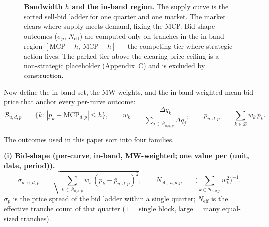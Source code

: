 \documentclass[11pt]{article}
\begin{document}
\begin{figure}[htbp]
\caption{\textbf{Bandwidth $h$ and the in-band region.} The supply curve
is the sorted sell-bid ladder for one quarter and one market. The market
clears where supply meets demand, fixing the MCP. Bid-shape outcomes
($\sigma_p$, $N_{\text{eff}}$) are computed only on tranches in the
in-band region $[\text{MCP}-h,\ \text{MCP}+h]$ --- the competing tier
where strategic action lives. The parked tier above the clearing-price
ceiling is a non-strategic placeholder (\hyperref[sec:context]{Appendix~C}) and
is excluded by construction.}
\label{fig:in-band-bandwidth}
\end{figure}

Now define the in-band set, the MW weights, and the in-band weighted mean bid price that anchor every per-curve outcome:
\[
\mathcal{B}_{u,d,p} \;=\; \{k:\,|p_k-\text{MCP}_{d,p}|\le h\}, \qquad w_k \;=\; \frac{\Delta q_k}{\sum_{j\in\mathcal{B}_{u,d,p}} \Delta q_j}, \qquad \bar p_{u,d,p} \;=\; \sum_{k\in\mathcal{B}} w_k\,p_k.
\]

The outcomes used in this paper sort into four families.

\textbf{(i) Bid-shape (per-curve, in-band, MW-weighted; one value per (unit, date, period)).}
\[
\sigma_{p,\,u,d,p} \;=\; \sqrt{\sum_{k\in\mathcal{B}_{u,d,p}} w_k\,(p_k-\bar p_{u,d,p})^2}, \qquad
N_{\text{eff},\,u,d,p} \;=\; \Big(\sum_{k\in\mathcal{B}_{u,d,p}} w_k^2\Big)^{-1}.
\]
$\sigma_p$ is the price spread of the bid ladder within a single quarter; $N_{\text{eff}}$ is the effective tranche count of that quarter ($1$ = single block, large = many equal-sized tranches).
\vspace{6pt}
\end{document}
